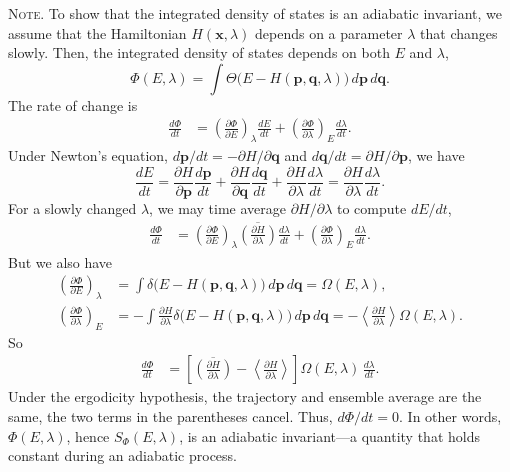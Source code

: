 \documentclass[preprint]{revtex4-1}
\newcommand{\note}[1]{{\color{DarkGreen}\footnotesize \textsc{Note.} #1}}
\begin{document}
\note{
  To show that
  the integrated density of states
  is an adiabatic invariant,
  we assume that
  the Hamiltonian $H(\mathbf x, \lambda)$
  depends on a parameter $\lambda$
  that changes slowly.
  Then, the integrated density of states
  depends on both $E$ and $\lambda$,
  $$
  \Phi(E, \lambda)
  =
  \int \Theta\bigl(
    E - H(\mathbf p, \mathbf q, \lambda)
  \bigr)
  \, d\mathbf p \, d\mathbf q
  .
  $$
  The rate of change is
  \begin{align*}
  \frac{ d \Phi } { dt }
  &=
  \left(
    \frac{ \partial \Phi } { \partial E }
  \right)_\lambda
  \frac{ dE } { dt }
  +
  \left(
    \frac{ \partial \Phi } { \partial \lambda }
  \right)_E
  \frac{ d\lambda } { dt }
  .
  \end{align*}
  Under Newton's equation,
  $d\mathbf p/dt = -\partial H/\partial \mathbf q$
  and
  $d\mathbf q/dt = \partial H/\partial \mathbf p$,
  we have
  $$
  \frac{ dE } { dt }
  =
  \frac{ \partial H } { \partial \mathbf p }
  \frac{ d \mathbf p } { d t }
  +
  \frac{ \partial H } { \partial \mathbf q }
  \frac{ d \mathbf q } { d t }
  +
  \frac{ \partial H } { \partial \lambda }
  \frac{ d \lambda } { dt }
  =
  \frac{ \partial H } { \partial \lambda }
  \frac{ d \lambda } { dt }
  .
  $$
  For a slowly changed $\lambda$,
  we may time average $\partial H / \partial \lambda$
  to compute $dE/dt$,
  \begin{align*}
  \frac{ d \Phi } { dt }
  &=
  \left(
    \frac{ \partial \Phi } { \partial E }
  \right)_\lambda
  \overline{
    \left(
    \frac{ \partial H } { \partial \lambda }
    \right)
  }
  \frac{ d\lambda } { dt }
  +
  \left(
    \frac{ \partial \Phi } { \partial \lambda }
  \right)_E
  \frac{ d\lambda } { dt }
  .
  \end{align*}
  But we also have
  \begin{align*}
  \left(
    \frac{ \partial \Phi } { \partial E }
  \right)_\lambda
  &=
  \int
  \delta\bigl(
    E - H(\mathbf p, \mathbf q, \lambda)
  \bigr)
  \, d\mathbf p \, d\mathbf q
  =
  \Omega(E, \lambda)
  ,
  \\
  \left(
    \frac{ \partial \Phi } { \partial \lambda }
  \right)_E
  &=
  -\int
  \frac{ \partial H } { \partial \lambda }
  \delta\bigl(
    E - H(\mathbf p, \mathbf q, \lambda)
  \bigr)
  \, d\mathbf p \, d\mathbf q
  =
  -\left\langle
    \frac{ \partial H } { \partial \lambda }
  \right\rangle
  \Omega(E, \lambda)
  .
  \end{align*}
  So
  \begin{align*}
  \frac{ d \Phi } { dt }
  &=
  \left[
    \overline{
      \left(
        \frac{ \partial H } { \partial \lambda }
      \right)
    }
    -
    \left\langle
      \frac{ \partial H } { \partial \lambda }
    \right\rangle
  \right]
  \Omega(E, \lambda) \,
  \frac{ d\lambda } { dt }
  .
  \end{align*}
  Under the ergodicity hypothesis,
  the trajectory and ensemble average
  are the same,
  the two terms in the parentheses cancel.
  Thus, $d\Phi/dt = 0$.
  In other words,
  $\Phi(E, \lambda)$, hence $S_\Phi(E, \lambda)$,
  is an adiabatic invariant---a quantity that holds constant
  during an adiabatic process.
}
\end{document}
